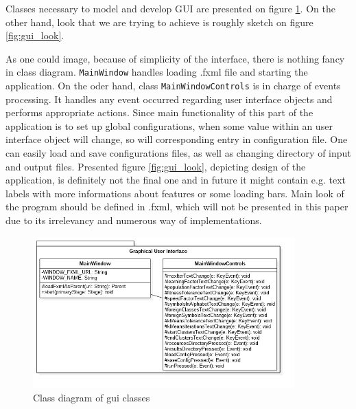 \documentclass{mini}
\begin{document}
Classes necessary to model and develop GUI are presented on figure \ref{fig:gui_classes}. On the other hand, look that we are trying to achieve is roughly sketch on figure \ref{fig:gui_look}.

As one could image, because of simplicity of the interface, there is nothing fancy in class diagram. \texttt{MainWindow} handles loading .fxml file and starting the application. On the oder hand, class \texttt{MainWindowControls} is in charge of events processing. It handles any event occurred regarding user interface objects and performs appropriate actions. Since main functionality of this part of the application is to set up global configurations, when some value within an user interface object will change, so will corresponding entry in configuration file. One can easily load and save configurations files, as well as changing directory of input and output files. Presented figure \ref{fig:gui_look}, depicting design of the application, is definitely not the final one and in future it might contain e.g. text labels with more informations about features or some loading bars. Main look of the program should be defined in .fxml, which will not be presented in this paper due to its irrelevancy and numerous way of implementations. 

\begin{figure}[H]
    \centering
    \includegraphics[width=0.9\textwidth]{images/gui.jpg}
    \caption{Class diagram of gui classes}
    \label{fig:gui_classes}
\end{figure}

\makestatement
\end{document}
